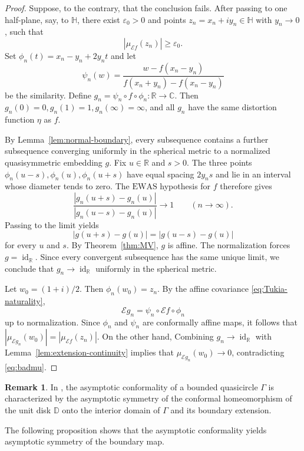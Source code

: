 \documentclass[11pt]{amsart}
\numberwithin{equation}{section}
\theoremstyle{definition} %
\theoremstyle{remarkstyle}
\newtheorem*{remark}{Remark} %
\newcommand{\R}{\mathbb{R}}
\newcommand{\C}{\mathbb{C}}
\newcommand{\Hh}{\mathbb{H}}
\newcommand{\id}{\operatorname{id}}
\begin{document}
\begin{proof}
Suppose, to the contrary, that the conclusion fails. 
After passing to one half-plane, say, to $\mathbb H$, there exist $\varepsilon_0>0$ and points
$z_n=x_n+iy_n\in\Hh$ with $y_n\to0$,
such that
\begin{equation}\label{eq:badmu}
 |\mu_{\mathcal Ef}(z_n)|\ge\varepsilon_0.
\end{equation}
Set
$\phi_n(t)=x_n-y_n+2y_nt$
and let
\[
 \psi_n(w)=
 \frac{w-f(x_n-y_n)}{f(x_n+y_n)-f(x_n-y_n)}
\]
be the similarity. 
Define
$g_n=\psi_n\circ f\circ\phi_n\colon\R\to\C$.
Then
$g_n(0)=0, g_n(1)=1, g_n(\infty)=\infty$, and all $g_n$ have the same distortion function $\eta$ as $f$.

By Lemma~\ref{lem:normal-boundary}, every subsequence contains a further
subsequence converging uniformly in the spherical metric to a normalized
quasisymmetric embedding $g$.  
Fix $u\in\R$ and $s>0$.  
The three points $\phi_n(u-s), \phi_n(u), \phi_n(u+s)$ have equal spacing $2y_ns$ and lie in an interval whose diameter tends to zero.  
The $\mathrm{EWAS}$ hypothesis for $f$ therefore gives
\[
 \frac{|g_n(u+s)-g_n(u)|}{|g_n(u-s)-g_n(u)|}\to 1 \qquad (n \to \infty).
\]
Passing to the limit yields
\[
 |g(u+s)-g(u)|=|g(u-s)-g(u)|
\]
for every $u$ and $s$.  
By Theorem~\ref{thm:MV}, $g$ is affine.  
The normalization forces $g=\id_{\R}$.  
Since every convergent subsequence has the same unique limit, we conclude that
$ g_n\to\id_{\R}$
uniformly in the spherical metric.

Let $w_0=(1+i)/2$.
Then $\phi_n(w_0)=z_n$. 
By the affine covariance \eqref{eq:Tukia-naturality},
\[
 \mathcal Eg_n
 =\psi_n\circ\mathcal Ef\circ\phi_n
\]
up to normalization.
Since $\phi_n$ and $\psi_n$ are conformally affine maps, 
it follows that $|\mu_{\mathcal Eg_n}(w_0)|=|\mu_{\mathcal Ef}(z_n)|$.
On the other hand, Combining $ g_n\to\id_{\R}$ with Lemma~\ref{lem:extension-continuity} implies that $\mu_{\mathcal Eg_n}(w_0)\to 0$, contradicting \eqref{eq:badmu}.
\end{proof}

\begin{remark}
In \cite{AndoniYang}, the asymptotic conformality of a bounded quasicircle $\Gamma$ is characterized by the asymptotic symmetry of the conformal homeomorphism of the unit disk $\mathbb D$ onto the interior domain of $\Gamma$ and its boundary extension.
\end{remark}


The following proposition shows that the asymptotic conformality yields asymptotic symmetry of the boundary map.
\end{document}
